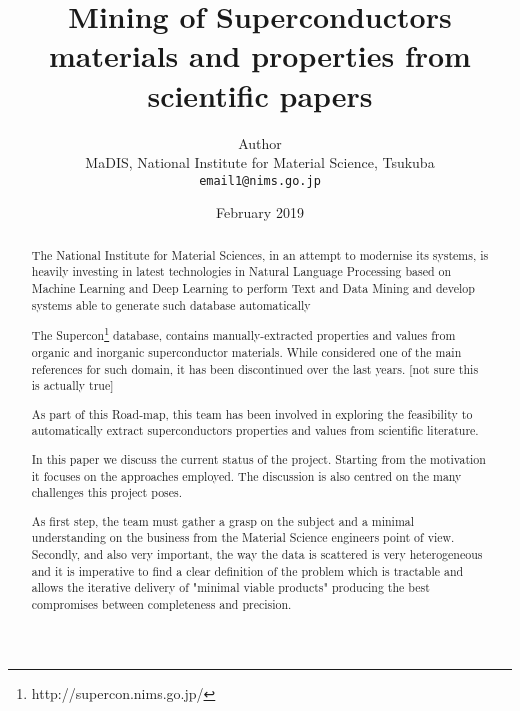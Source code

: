 \documentclass{article}
\title{Mining of Superconductors materials and properties from scientific papers}
\author{
  Author\\
  MaDIS, National Institute for Material Science, Tsukuba\\
  \texttt{email1@nims.go.jp}
}
\date{February 2019}
\begin{document}
\maketitle

\tableofcontents

\pagebreak

\begin{abstract}
The National Institute for Material Sciences, in an attempt to modernise its systems, is heavily investing in latest technologies in Natural Language Processing based on Machine Learning and Deep Learning to perform Text and Data Mining and develop systems able to generate such database automatically 

The Supercon\footnote{http://supercon.nims.go.jp/} database, contains manually-extracted properties and values from organic and inorganic superconductor materials. While considered one of the main references for such domain, it has been discontinued over the last years. [not sure this is actually true]

As part of this Road-map, this team has been involved in exploring the feasibility to automatically extract superconductors properties and values from scientific literature. 

In this paper we discuss the current status of the project. Starting from the motivation it focuses on the approaches employed. 
The discussion is also centred on the many challenges this project poses. 

As first step, the team must gather a grasp on the subject and a minimal understanding on the business from the Material Science engineers point of view. 
Secondly, and also very important, the way the data is scattered is very heterogeneous and it is imperative to find a clear definition of the problem which is tractable and allows the iterative delivery of "minimal viable products" producing the best compromises between completeness and precision. 



\end{abstract}
\end{document}
